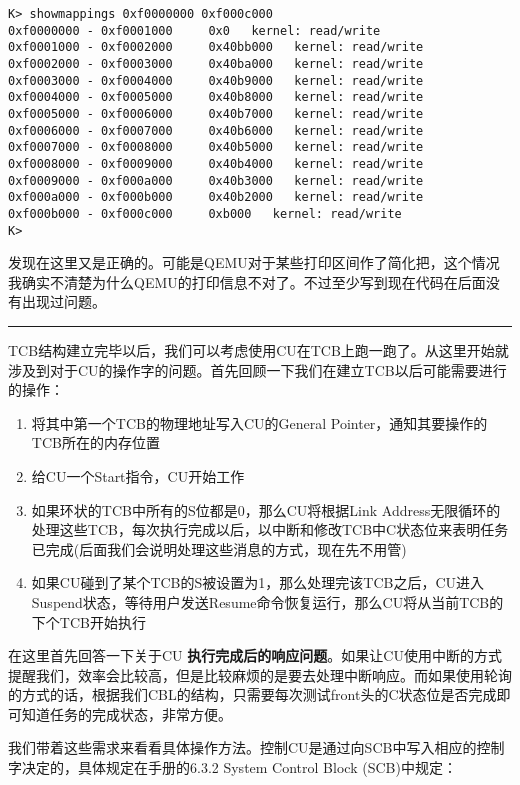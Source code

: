 \documentclass{article}
\newcommand{\highlight}[1]{{\bfseries \color{red}  #1}}
\begin{document}
\begin{CJK*}{UTF8}{gkai}
\begin{lstlisting}[style=console]
K> showmappings 0xf0000000 0xf000c000
0xf0000000 - 0xf0001000     0x0   kernel: read/write
0xf0001000 - 0xf0002000     0x40bb000   kernel: read/write
0xf0002000 - 0xf0003000     0x40ba000   kernel: read/write
0xf0003000 - 0xf0004000     0x40b9000   kernel: read/write
0xf0004000 - 0xf0005000     0x40b8000   kernel: read/write
0xf0005000 - 0xf0006000     0x40b7000   kernel: read/write
0xf0006000 - 0xf0007000     0x40b6000   kernel: read/write
0xf0007000 - 0xf0008000     0x40b5000   kernel: read/write
0xf0008000 - 0xf0009000     0x40b4000   kernel: read/write
0xf0009000 - 0xf000a000     0x40b3000   kernel: read/write
0xf000a000 - 0xf000b000     0x40b2000   kernel: read/write
0xf000b000 - 0xf000c000     0xb000   kernel: read/write
K> 
\end{lstlisting}

发现在这里又是正确的。可能是QEMU对于某些打印区间作了简化把，这个情况我确实不清楚为什么QEMU的打印信息不对了。不过至少写到现在代码在后面没有出现过问题。

\vspace{1em}
\hrule
\vspace{1em}

TCB结构建立完毕以后，我们可以考虑使用CU在TCB上跑一跑了。从这里开始就涉及到对于CU的操作字的问题。首先回顾一下我们在建立TCB以后可能需要进行的操作：

\begin{enumerate}
\item{将其中第一个TCB的物理地址写入CU的General Pointer，通知其要操作的TCB所在的内存位置}
\item{给CU一个Start指令，CU开始工作}
\item{如果环状的TCB中所有的S位都是0，那么CU将根据Link Address无限循环的处理这些TCB，每次执行完成以后，以中断和修改TCB中C状态位来表明任务已完成(后面我们会说明处理这些消息的方式，现在先不用管)}
\item{如果CU碰到了某个TCB的S被设置为1，那么处理完该TCB之后，CU进入Suspend状态，等待用户发送Resume命令恢复运行，那么CU将从当前TCB的下个TCB开始执行}
\end{enumerate}

在这里首先回答一下关于CU\highlight{执行完成后的响应问题}。如果让CU使用中断的方式提醒我们，效率会比较高，但是比较麻烦的是要去处理中断响应。而如果使用轮询的方式的话，根据我们CBL的结构，只需要每次测试front头的C状态位是否完成即可知道任务的完成状态，非常方便。

我们带着这些需求来看看具体操作方法。控制CU是通过向SCB中写入相应的控制字决定的，具体规定在手册的6.3.2 System Control Block (SCB)中规定：


\end{CJK*}
\end{document}
